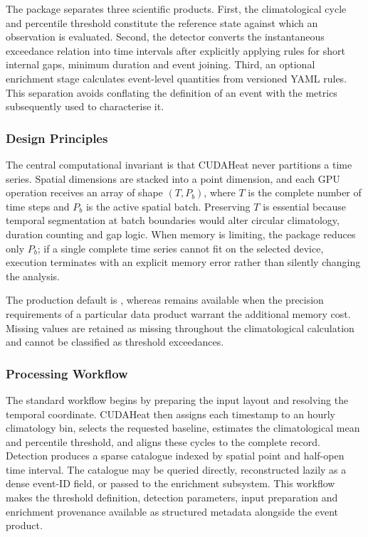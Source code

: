 The package separates three scientific products. First, the climatological cycle and percentile threshold constitute the reference state against which an observation is evaluated. Second, the detector converts the instantaneous exceedance relation into time intervals after explicitly applying rules for short internal gaps, minimum duration and event joining. Third, an optional enrichment stage calculates event-level quantities from versioned YAML rules. This separation avoids conflating the definition of an event with the metrics subsequently used to characterise it.

\subsubsection{Design Principles}

The central computational invariant is that CUDAHeat never partitions a time series. Spatial dimensions are stacked into a point dimension, and each GPU operation receives an array of shape $(T, P_b)$, where $T$ is the complete number of time steps and $P_b$ is the active spatial batch. Preserving $T$ is essential because temporal segmentation at batch boundaries would alter circular climatology, duration counting and gap logic. When memory is limiting, the package reduces only $P_b$; if a single complete time series cannot fit on the selected device, execution terminates with an explicit memory error rather than silently changing the analysis.

The production default is , whereas  remains available when the precision requirements of a particular data product warrant the additional memory cost. Missing values are retained as missing throughout the climatological calculation and cannot be classified as threshold exceedances.

\subsubsection{Processing Workflow}

The standard workflow begins by preparing the input layout and resolving the temporal coordinate. CUDAHeat then assigns each timestamp to an hourly climatology bin, selects the requested baseline, estimates the climatological mean and percentile threshold, and aligns these cycles to the complete record. Detection produces a sparse catalogue indexed by spatial point and half-open time interval. The catalogue may be queried directly, reconstructed lazily as a dense event-ID field, or passed to the enrichment subsystem. This workflow makes the threshold definition, detection parameters, input preparation and enrichment provenance available as structured metadata alongside the event product.
